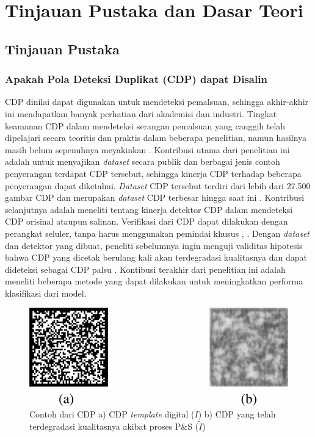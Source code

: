 \chapter{Tinjauan Pustaka dan Dasar Teori}

\section{Tinjauan Pustaka}

\subsection{Apakah Pola Deteksi Duplikat (CDP) dapat Disalin}
CDP dinilai dapat digunakan untuk mendeteksi pemalsuan, sehingga akhir-akhir ini mendapatkan banyak perhatian dari akademisi dan industri. Tingkat keamanan CDP
dalam mendeteksi serangan pemalsuan yang canggih telah dipelajari secara teoritis dan praktis dalam beberapa penelitian, namun hasilnya masih belum sepenuhnya
meyakinkan \cite{PICARDCANCOPYDETECTIONPATTERN}. Kontribusi utama dari penelitian ini adalah untuk menyajikan \emph{dataset} secara publik dan berbagai jenis
contoh penyerangan terdapat CDP tersebut, sehingga kinerja CDP terhadap beberapa penyerangan dapat diketahui. \emph{Dataset} CDP tersebut terdiri dari lebih
dari 27.500 gambar CDP dan merupakan \emph{dataset} CDP terbesar hingga saat ini \cite{PICARDCANCOPYDETECTIONPATTERN}. Kontribusi selanjutnya adalah meneliti
tentang kinerja detektor CDP dalam mendeteksi CDP orisinal ataupun salinan. Verifikasi dari CDP dapat dilakukan dengan perangkat seluler, tanpa harus
menggunakan pemindai khusus \cite{WONG2017}, \cite{SCHRAML2018REAL}. Dengan \emph{dataset} dan detektor yang dibuat, peneliti sebelumnya ingin menguji
validitas hipotesis bahwa CDP yang dicetak berulang kali akan terdegradasi kualitasnya dan dapat dideteksi sebagai CDP palsu
\cite{PICARDCANCOPYDETECTIONPATTERN}. Kontibusi terakhir dari penelitian ini adalah meneliti beberapa metode yang dapat dilakukan untuk meningkatkan performa
klasifikasi dari model.

\begin{figure}[!ht]
	\centering
	\includegraphics[width=12cm]{contents/chapter-2/2-cdporivsfake.png}
	\caption[Contoh dari CDP a) CDP \emph{template} digital ($I$) b) CDP yang telah terdegradasi kualitasnya akibat proses P\&S ($\widetilde{I}$)]{Contoh dari CDP a) CDP \emph{template} digital ($I$) b) CDP yang telah terdegradasi kualitasnya akibat proses P\&S ($\widetilde{I}$) \cite{PICARDCANCOPYDETECTIONPATTERN}}
	\label{Fig: 2-cdporivsfake}
\end{figure}

